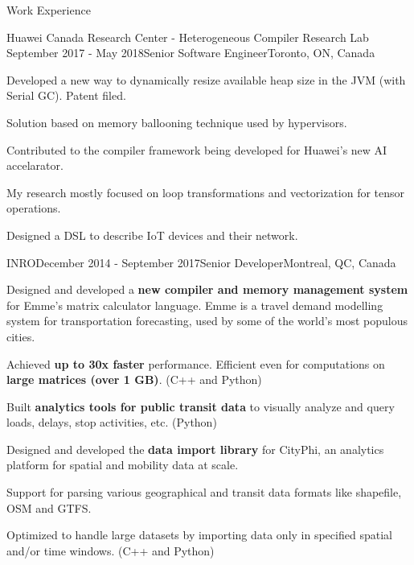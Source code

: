 \documentclass{resume} %
\begin{document}
\begin{rSection}{Work Experience}
\begin{rSubsection}{Huawei Canada Research Center - Heterogeneous Compiler Research Lab}
	{September 2017 - May 2018}{Senior Software Engineer}{Toronto, ON, Canada}
\item Developed a new way to dynamically resize available heap size in the JVM (with Serial GC). Patent filed.
\begin{lsubSubsection} 
\item Solution based on memory ballooning technique used by hypervisors. 
\end{lsubSubsection}
\item Contributed to the compiler framework being developed for Huawei's new AI accelarator.
\begin{lsubSubsection} 
\item My research mostly focused on loop transformations and vectorization for tensor operations.
\end{lsubSubsection}
\item Designed a DSL to describe IoT devices and their network.
\end{rSubsection}

\begin{rSubsection}{INRO}{December 2014 - September 2017}{Senior Developer}{Montreal,
        QC, Canada}
\item Designed and developed a \textbf{new compiler and memory management system} for Emme's
        matrix calculator language. Emme is a travel demand modelling system
        for transportation forecasting, used by some of the world's most
        populous cities.
\begin{lsubSubsection} 
\item Achieved \textbf{up to 30x faster} performance. Efficient even for
        computations on \textbf{large matrices (over 1 GB)}. (C++ and Python)
\end{lsubSubsection}
\item Built \textbf{analytics tools for public transit
	data} to visually analyze and query loads, delays, stop activities, etc. (Python)
\item Designed and developed the \textbf{data import library} for CityPhi,
        an analytics platform for spatial and mobility data at scale.
\begin{lsubSubsection}
\item Support for parsing various geographical and transit data formats like shapefile,
        OSM and GTFS.
\item Optimized to handle large datasets by importing data only in specified
        spatial and/or time windows. (C++ and Python)
\end{lsubSubsection}
\end{rSubsection}


\end{rSection}
\end{document}
